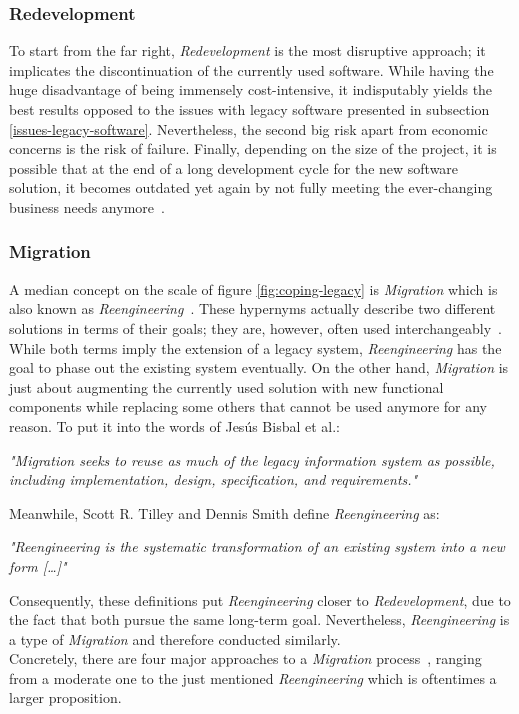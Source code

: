 \documentclass[12pt,a4paper]{report}
\begin{document}
\subsubsection{Redevelopment}

To start from the far right, \textit{Redevelopment} is the most disruptive approach;
it implicates the discontinuation of the currently used software.
While having the huge disadvantage of being immensely cost-intensive, it indisputably
yields the best results opposed to the issues with legacy software presented in
subsection \ref{issues-legacy-software}.
Nevertheless, the second big risk apart from economic concerns is
the risk of failure.
Finally, depending on the size of the project, it is possible that at the end
of a long development cycle for the new software solution, it becomes outdated
yet again by not fully meeting the ever-changing
business needs anymore~\cite{stevens-software-reengineering-patterns}.


\subsubsection{Migration}

A median concept on the scale of figure \ref{fig:coping-legacy} is \textit{Migration}
which is also known as \textit{Reengineering}~\cite{tilley-perspectives-reengineering}.
These hypernyms actually describe two different solutions in terms of their goals;
they are, however, often used interchangeably~\cite{bisbal-legacy-issues}.
While both terms imply the extension of a legacy system, \textit{Reengineering}
has the goal to phase out the existing system eventually.
On the other hand, \textit{Migration} is just about augmenting the currently used
solution with new functional components while replacing some others that cannot be used anymore
for any reason. To put it into the words of Jesús Bisbal et al.:
\begin{displayquote}
\emph{"Migration seeks to reuse as much of the legacy information system as possible,
including implementation, design, specification, and requirements."}~\cite{bisbal-legacy-issues}
\end{displayquote}
Meanwhile, Scott R. Tilley and Dennis Smith define \textit{Reengineering} as:
\begin{displayquote}
\emph{"Reengineering is the systematic transformation of an existing system
into a new form […]"}~\cite{tilley-perspectives-reengineering}
\end{displayquote}
Consequently, these definitions put \textit{Reengineering} closer to \textit{Redevelopment},
due to the fact that both pursue the same long-term goal.
Nevertheless, \textit{Reengineering} is a type of \textit{Migration} and
therefore conducted similarly.\\
Concretely, there are four major approaches to a \textit{Migration}
process~\cite{malinova-legacy-techniques, seacord-modernizing-legacy},
ranging from a moderate one to the just mentioned \textit{Reengineering}
which is oftentimes a larger proposition.
\end{document}
